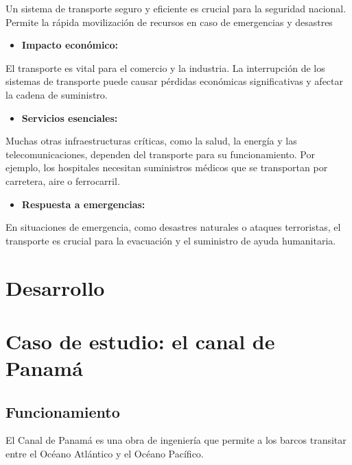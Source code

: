 \documentclass{article}
\providecommand{\tightlist}{%
  \setlength{\itemsep}{0pt}\setlength{\parskip}{0pt}}
\begin{document}
Un sistema de transporte seguro y eficiente es crucial para la seguridad
nacional. Permite la rápida movilización de recursos en caso de
emergencias y desastres

\begin{itemize}
\tightlist
\item
  \textbf{Impacto económico:}
\end{itemize}

El transporte es vital para el comercio y la industria. La interrupción
de los sistemas de transporte puede causar pérdidas económicas
significativas y afectar la cadena de suministro.

\begin{itemize}
\tightlist
\item
  \textbf{Servicios esenciales:}
\end{itemize}

Muchas otras infraestructuras críticas, como la salud, la energía y las
telecomunicaciones, dependen del transporte para su funcionamiento. Por
ejemplo, los hospitales necesitan suministros médicos que se transportan
por carretera, aire o ferrocarril.

\begin{itemize}
\tightlist
\item
  \textbf{Respuesta a emergencias:}
\end{itemize}

En situaciones de emergencia, como desastres naturales o ataques
terroristas, el transporte es crucial para la evacuación y el suministro
de ayuda humanitaria.

\hypertarget{desarrollo}{%
\section{Desarrollo}\label{desarrollo}}

\hypertarget{caso-de-estudio-el-canal-de-panamuxe1}{%
\section{Caso de estudio: el canal de
Panamá}\label{caso-de-estudio-el-canal-de-panamuxe1}}

\hypertarget{funcionamiento}{%
\subsection{Funcionamiento}\label{funcionamiento}}

El Canal de Panamá es una obra de ingeniería que permite a los barcos
transitar entre el Océano Atlántico y el Océano Pacífico.
\end{document}
